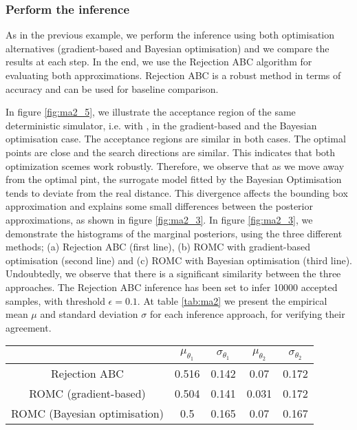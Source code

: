 \subsubsection*{Perform the inference}

As in the previous example, we perform the inference using both
optimisation alternatives (gradient-based and Bayesian optimisation)
and we compare the results at each step. In the end, we use the
Rejection ABC algorithm for evaluating both approximations. Rejection
ABC is a robust method in terms of accuracy and can be used for
baseline comparison.

In figure \ref{fig:ma2_5}, we illustrate the acceptance region of the
same deterministic simulator, i.e. with , in the
gradient-based and the Bayesian optimisation case. The acceptance
regions are similar in both cases. The optimal points are close and
the search directions are similar. This indicates that both
optimization scemes work robustly. Therefore, we observe that as we
move away from the optimal pint, the surrogate model fitted by the
Bayesian Optimisation tends to deviate from the real distance. This
divergence affects the bounding box approximation and explains some
small differences between the posterior approximations, as shown in
figure \ref{fig:ma2_3}. In figure \ref{fig:ma2_3}, we demonstrate the
histograms of the marginal posteriors, using the three different
methods; (a) Rejection ABC (first line), (b) ROMC with gradient-based
optimisation (second line) and (c) ROMC with Bayesian optimisation
(third line). Undoubtedly, we observe that there is a significant
similarity between the three approaches. The Rejection ABC inference
has been set to infer 10000 accepted samples, with threshold
$\epsilon=0.1$. At table \ref{tab:ma2} we present the empirical mean
$\mu$ and standard deviation $\sigma$ for each inference approach, for
verifying their agreement.

\begin{center} \label{tab:ma2}
\begin{tabular}{ c|c|c|c|c }
\hline
& $\mu_{\theta_1}$ & $\sigma_{\theta_1}$ & $\mu_{\theta_2}$ & $\sigma_{\theta_2}$ \\
\hline \hline
Rejection ABC & 0.516 & 0.142 & 0.07 & 0.172 \\
\hline
ROMC (gradient-based) & 0.504 & 0.141 & 0.031 & 0.172 \\
\hline
ROMC (Bayesian optimisation) & 0.5 & 0.165 & 0.07 & 0.167 \\
\hline
\end{tabular}
\end{center}

